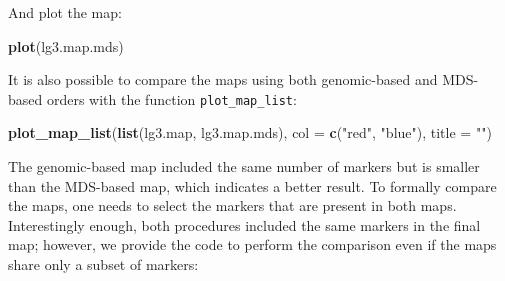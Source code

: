 \documentclass[
]{article}
\newenvironment{Shaded}{}{}
\newcommand{\DataTypeTok}[1]{\textcolor[rgb]{0.56,0.13,0.00}{#1}}
\newcommand{\DecValTok}[1]{\textcolor[rgb]{0.25,0.63,0.44}{#1}}
\newcommand{\FloatTok}[1]{\textcolor[rgb]{0.25,0.63,0.44}{#1}}
\newcommand{\KeywordTok}[1]{\textcolor[rgb]{0.00,0.44,0.13}{\textbf{#1}}}
\newcommand{\NormalTok}[1]{#1}
\newcommand{\OperatorTok}[1]{\textcolor[rgb]{0.40,0.40,0.40}{#1}}
\newcommand{\OtherTok}[1]{\textcolor[rgb]{0.00,0.44,0.13}{#1}}
\newcommand{\StringTok}[1]{\textcolor[rgb]{0.25,0.44,0.63}{#1}}
\begin{document}
\begin{Shaded}
\end{Shaded}

And plot the map:

\begin{Shaded}
\begin{Highlighting}[]
\KeywordTok{plot}\NormalTok{(lg3.map.mds)}
\end{Highlighting}
\end{Shaded}

It is also possible to compare the maps using both genomic-based and
MDS-based orders with the function \texttt{plot\_map\_list}:

\begin{Shaded}
\begin{Highlighting}[]
\KeywordTok{plot_map_list}\NormalTok{(}\KeywordTok{list}\NormalTok{(lg3.map, lg3.map.mds), }\DataTypeTok{col =} \KeywordTok{c}\NormalTok{(}\StringTok{"red"}\NormalTok{, }\StringTok{"blue"}\NormalTok{), }\DataTypeTok{title =} \StringTok{""}\NormalTok{)}
\end{Highlighting}
\end{Shaded}

The genomic-based map included the same number of markers but is smaller
than the MDS-based map, which indicates a better result. To formally
compare the maps, one needs to select the markers that are present in
both maps. Interestingly enough, both procedures included the same
markers in the final map; however, we provide the code to perform the
comparison even if the maps share only a subset of markers:
\end{document}
